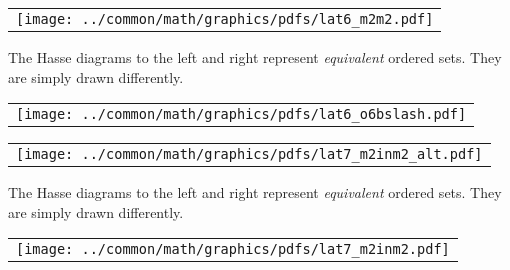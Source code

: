 \begin{tabular}{c}\texttt{[image: ../common/math/graphics/pdfs/lat6\_m2m2.pdf]}\end{tabular}\hfill%
\begin{minipage}{\tw-50mm}\raggedright
\begin{example}
The Hasse diagrams to the left and right represent 
\emph{equivalent} ordered sets.
They are simply drawn differently.
\end{example}
\end{minipage}%
\hfill\begin{tabular}{c}\texttt{[image: ../common/math/graphics/pdfs/lat6\_o6bslash.pdf]}\end{tabular}%

\begin{tabular}{c}\texttt{[image: ../common/math/graphics/pdfs/lat7\_m2inm2\_alt.pdf]}\end{tabular}\hfill%
\begin{minipage}{\tw-50mm}\raggedright
\begin{example}
The Hasse diagrams to the left and right represent 
\emph{equivalent} ordered sets.
They are simply drawn differently.
\end{example}
\end{minipage}%
\hfill\begin{tabular}{c}\texttt{[image: ../common/math/graphics/pdfs/lat7\_m2inm2.pdf]}\end{tabular}

